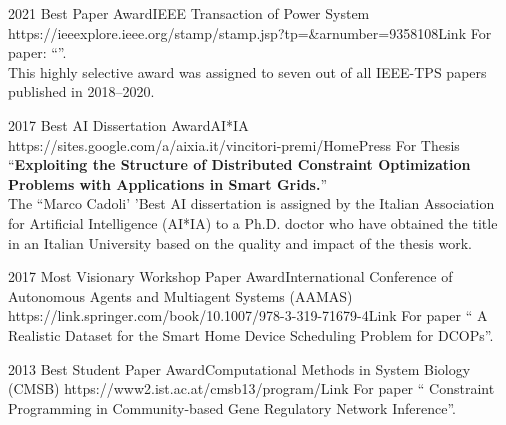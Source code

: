 \begin{awards}

	\awardentryD
	{2021}
	{Best Paper Award}{IEEE Transaction of Power System}
	{https://ieeexplore.ieee.org/stamp/stamp.jsp?tp=\&arnumber=9358108}{Link}
	{
	For paper: ``''.\\
	This highly selective award was assigned to seven out of all IEEE-TPS papers published in 2018--2020.}

	\awardentryD
	{2017}
	{Best AI Dissertation Award}{AI*IA} %
	{https://sites.google.com/a/aixia.it/vincitori-premi/Home}{Press}
	{For Thesis ``\textbf{Exploiting the Structure of Distributed Constraint Optimization Problems with Applications in Smart Grids.}''\\
	The ``Marco Cadoli' 'Best AI dissertation is assigned by the Italian 
	Association for Artificial Intelligence (AI*IA) to a Ph.D. doctor 
	who have obtained the title in an Italian University based on the 
	quality and impact of the thesis work.
	}

	\awardentryD
	{2017}
	{Most Visionary Workshop Paper Award}{International Conference of 
	Autonomous Agents and Multiagent Systems (AAMAS)}
   {https://link.springer.com/book/10.1007/978-3-319-71679-4}{Link}
   {For paper ``
   {A Realistic Dataset for the Smart Home Device Scheduling Problem for DCOPs}''.}

	\awardentryD
	{2013}
	{Best Student Paper Award}{Computational Methods in System Biology (CMSB)}
	{https://www2.ist.ac.at/cmsb13/program/}{Link}
	{For paper ``
	{Constraint Programming in Community-based Gene Regulatory Network Inference}''.} 

\end{awards}



